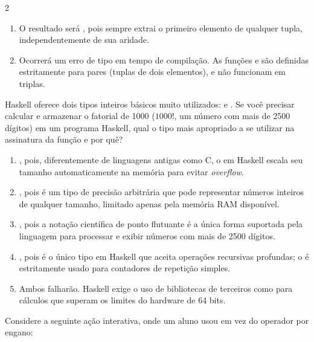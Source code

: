 \documentclass[a4paper,10pt,brazil]{article}
\begin{document}
\begin{multicols}{2}
\begin{enumerate}
  \item O resultado será , pois  sempre extrai o primeiro elemento de qualquer tupla, independentemente de sua aridade.

  \item Ocorrerá um erro de tipo em tempo de compilação. As funções  e  são definidas estritamente para pares (tuplas de dois elementos), e não funcionam em triplas.


\end{enumerate}

Haskell oferece dois tipos inteiros básicos muito utilizados:  e . Se você precisar calcular e armazenar o fatorial de 1000 ($1000!$, um número com mais de 2500 dígitos) em um programa Haskell, qual o tipo mais apropriado a se utilizar na assinatura da função e por quê?

\begin{enumerate}
  \item {}, pois, diferentemente de linguagens antigas como C, o  em Haskell escala seu tamanho automaticamente na memória para evitar \emph{overflow}.

  \item {}, pois é um tipo de precisão arbitrária que pode representar números inteiros de qualquer tamanho, limitado apenas pela memória RAM disponível.

  \item {}, pois a notação científica de ponto flutuante é a única forma suportada pela linguagem para processar e exibir números com mais de 2500 dígitos.

  \item {}, pois é o único tipo em Haskell que aceita operações recursivas profundas; o  é estritamente usado para contadores de repetição simples.

  \item Ambos falharão. Haskell exige o uso de bibliotecas de terceiros como  para cálculos que superam os limites do hardware de 64 bits.


\end{enumerate}

Considere a seguinte ação interativa, onde um aluno usou  em vez do operador \haskellinline{<-} por engano:


\end{multicols}
\end{document}
